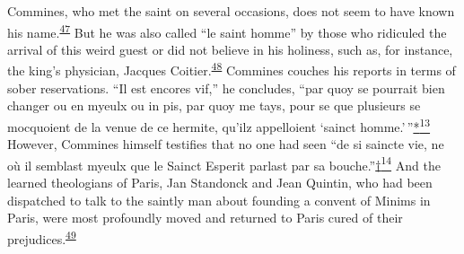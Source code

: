 Commines, who met the saint on several occasions, does not seem to have
known his
name.\textsuperscript{\protect\hypertarget{14_Chapter_Seven__THE_PIOUS_PERSONA.xhtmlux5cux23id_931}{\protect\hyperlink{23_NOTES.xhtmlux5cux23id_932}{47}}}
But he was also called ``le saint homme'' by those who ridiculed the
arrival of this weird guest or did not believe in his holiness, such as,
for instance, the king's physician, Jacques
Coitier.\textsuperscript{\protect\hypertarget{14_Chapter_Seven__THE_PIOUS_PERSONA.xhtmlux5cux23id_929}{\protect\hyperlink{23_NOTES.xhtmlux5cux23id_930}{48}}}
Commines couches his reports in terms of sober reservations. ``Il est
encores vif,'' he concludes, ``par quoy se pourrait bien changer ou en
my\protect\hypertarget{14_Chapter_Seven__THE_PIOUS_PERSONA.xhtmlux5cux23page_217}{}{}eulx
ou in pis, par quoy me tays, pour se que plusieurs se mocquoient de la
venue de ce hermite, qu'ilz appelloient `sainct
homme.'\,''\protect\hypertarget{14_Chapter_Seven__THE_PIOUS_PERSONA.xhtmlux5cux23id_2321}{\protect\hyperlink{23_NOTES.xhtmlux5cux23id_2322}{*\textsuperscript{13}}}
However, Commines himself testifies that no one had seen ``de si saincte
vie, ne où il semblast myeulx que le Sainct Esperit parlast par sa
bouche.''\protect\hypertarget{14_Chapter_Seven__THE_PIOUS_PERSONA.xhtmlux5cux23id_2323}{\protect\hyperlink{23_NOTES.xhtmlux5cux23id_2324}{†\textsuperscript{14}}}
And the learned theologians of Paris, Jan Standonck and Jean Quintin,
who had been dispatched to talk to the saintly man about founding a
convent of Minims in Paris, were most profoundly moved and returned to
Paris cured of their
prejudices.\textsuperscript{\protect\hypertarget{14_Chapter_Seven__THE_PIOUS_PERSONA.xhtmlux5cux23id_927}{\protect\hyperlink{23_NOTES.xhtmlux5cux23id_928}{49}}}

